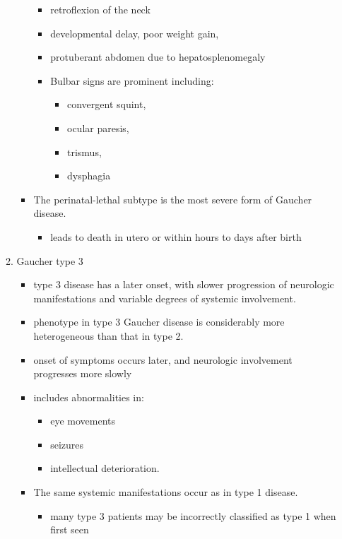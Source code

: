 \documentclass{scrartcl}
\begin{document}
\begin{enumerate}
\begin{enumerate}
\begin{itemize}
\begin{itemize}
\item retroflexion of the neck
\item developmental delay, poor weight gain,
\item protuberant abdomen due to hepatosplenomegaly
\item Bulbar signs are prominent including:
\begin{itemize}
\item convergent squint,
\item ocular paresis,
\item trismus,
\item dysphagia
\end{itemize}
\end{itemize}

\item The perinatal-lethal subtype is the most severe form of Gaucher
disease.

\begin{itemize}
\item leads to death in utero or within hours to days after
birth
\end{itemize}
\end{itemize}

\item Gaucher type 3
\label{sec:org74c324a}
\begin{itemize}
\item type 3 disease has a later onset, with slower progression of
neurologic manifestations and variable degrees of systemic
involvement.
\item phenotype in type 3 Gaucher disease is considerably more
heterogeneous than that in type 2.

\item onset of symptoms occurs later, and neurologic involvement
progresses more slowly

\item includes abnormalities in:
\begin{itemize}
\item eye movements
\item seizures
\item intellectual deterioration.
\end{itemize}

\item The same systemic manifestations occur as in type 1 disease.
\begin{itemize}
\item many type 3 patients may be incorrectly classified as type 1 when
first seen
\end{itemize}
\end{itemize}


\end{enumerate}
\end{enumerate}
\end{document}
